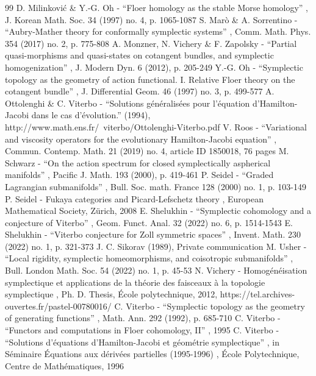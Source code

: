 \begin{thebibliography}{99}
 D. Milinković \& Y.-G. Oh - “Floer homology as the stable Morse homology” , J. Korean Math. Soc. 34 (1997) no. 4, p. 1065-1087
 S. Marò \& A. Sorrentino - “Aubry-Mather theory for conformally symplectic systems” , Comm. Math. Phys. 354 (2017) no. 2, p. 775-808
 A. Monzner, N. Vichery \& F. Zapolsky - “Partial quasi-morphisms and quasi-states on cotangent bundles, and symplectic homogenization” , J. Modern Dyn. 6 (2012), p. 205-249
 Y.-G. Oh - “Symplectic topology as the geometry of action functional. I. Relative Floer theory on the cotangent bundle” , J. Differential Geom. 46 (1997) no. 3, p. 499-577
 A. Ottolenghi \& C. Viterbo - “Solutions généralisées pour l’équation d’Hamilton-Jacobi dans le cas d’évolution.” (1994), http://www.math.ens.fr/~viterbo/Ottolenghi-Viterbo.pdf
 V. Roos - “Variational and viscosity operators for the evolutionary Hamilton-Jacobi equation” , Commun. Contemp. Math. 21 (2019) no. 4, article ID 1850018, 76 pages
 M. Schwarz - “On the action spectrum for closed symplectically aspherical manifolds” , Pacific J. Math. 193 (2000), p. 419-461
 P. Seidel - “Graded Lagrangian submanifolds” , Bull. Soc. math. France 128 (2000) no. 1, p. 103-149
 P. Seidel - Fukaya categories and Picard-Lefschetz theory , European Mathematical Society, Zürich, 2008
 E. Shelukhin - “Symplectic cohomology and a conjecture of Viterbo” , Geom. Funct. Anal. 32 (2022) no. 6, p. 1514-1543
 E. Shelukhin - “Viterbo conjecture for Zoll symmetric spaces” , Invent. Math. 230 (2022) no. 1, p. 321-373
 J. C. Sikorav (1989), Private communication
 M. Usher - “Local rigidity, symplectic homeomorphisms, and coisotropic submanifolds” , Bull. London Math. Soc. 54 (2022) no. 1, p. 45-53
 N. Vichery - Homogénéisation symplectique et applications de la théorie des faisceaux à la topologie symplectique , Ph. D. Thesis, École polytechnique, 2012, https://tel.archives-ouvertes.fr/pastel-00780016/
 C. Viterbo - “Symplectic topology as the geometry of generating functions” , Math. Ann. 292 (1992), p. 685-710
 C. Viterbo - “Functors and computations in Floer cohomology, II” , 1995
 C. Viterbo - “Solutions d’équations d’Hamilton-Jacobi et géométrie symplectique” , in Séminaire Équations aux dérivées partielles (1995-1996) , École Polytechnique, Centre de Mathématiques, 1996

\end{thebibliography}

